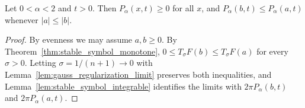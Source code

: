 \begin{theorem}\label{thm:stable_kernel_positive_monotone}
\leanok
Let $0 < \alpha < 2$ and $t > 0$. Then $P_\alpha(x, t) \ge 0$ for all $x$, and $P_\alpha(b, t) \le P_\alpha(a, t)$ whenever $\lvert a \rvert \le \lvert b \rvert$.
\end{theorem}

\begin{proof}
\leanok
By evenness we may assume $a, b \ge 0$. By Theorem~\ref{thm:stable_symbol_monotone}, $0 \le T_\sigma F(b) \le T_\sigma F(a)$ for every $\sigma > 0$. Letting $\sigma = 1/(n+1) \to 0$ with Lemma~\ref{lem:gauss_regularization_limit} preserves both inequalities, and Lemma~\ref{lem:stable_symbol_integrable} identifies the limits with $2\pi P_\alpha(b, t)$ and $2\pi P_\alpha(a, t)$.
\end{proof}
